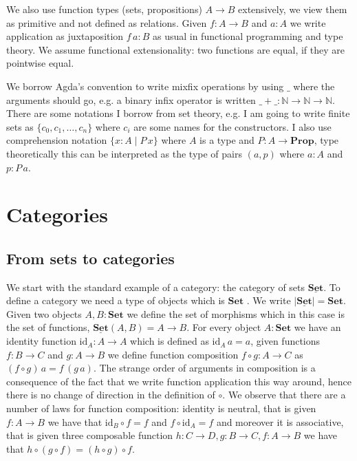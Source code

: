 \documentclass{article}
\newcommand{\Type}{\mathbf{Type}}
\newcommand{\TYPE}{\mathbf{TYPE}}
\newcommand{\Prop}{\mathbf{Prop}}
\newcommand{\PROP}{\mathbf{PROP}}
\newcommand{\Set}{\mathbf{Set}}
\newcommand{\SET}{\mathbf{SET}}
\newcommand{\cat}[1]{\underline{\mathbf{#1}}}
\newcommand{\cSet}{\cat{\Set}}
\newcommand{\obj}[1]{|#1|}
\newcommand{\id}{\mathrm{id}}
\newcommand{\Nat}{\mathbb{N}}
\begin{document}

We also use function types (sets, propositions) $A \to B$  extensively, we view them as primitive and not defined as relations. Given $f : A \to B$ and $a : A$ we write application as juxtaposition $f\,a : B$ as usual in functional programming and type theory. We assume functional extensionality: two functions are equal, if they are pointwise equal. 

We borrow Agda's convention to write mixfix operations by using $\_$ where the arguments should go, e.g. a binary infix operator is written $\_+\_ : \Nat \to \Nat \to \Nat$. There are some notations I borrow from set theory, e.g. I am going to write finite sets as $\{c_0,c_1, \dots, c_n \}$ where $c_i$ are some names for the constructors. I also use comprehension notation $\{ x : A \mid P\,x \}$ where $A$ is a type and $P :A \to \Prop$, type theoretically this can be interpreted as the type of pairs $(a,p)$ where $a:A$ and $p : P\,a$.%

\section{Categories}
\label{sec:categories}

\subsection{From sets to categories}
\label{sec:from-sets-categories}

We start with the standard example of a category: the category of sets $\cSet$. To define a category we need a type of objects which is $\Set$
. We write $\obj{\cSet} = \Set$. 
Given two objects $A,B : \Set$ we define the set of morphisms which in this case is the set of functions, $\cSet(A,B) = A \to B$. For every object $A : \Set$ we have an identity function $\id_A : A \to A$ which is defined as $\id_A\,a = a$, given functions $f : B \to C$ and $g : A \to B$ we define function composition $f \circ g : A \to C$ as $(f\circ g)\,a = f\,(g\,a)$. The strange order of arguments in composition is a consequence of the fact that we write function application this way around, hence there is no change of direction in the definition of $\circ$. We observe that there are a number of laws for function composition: identity is neutral, that is given $f : A \to B$ we have that $\id_B \circ f = f$ and $f \circ \id_A = f$ and moreover it is associative, that is given three composable function $h : C \to D, g : B \to C, f : A \to B$ we have that $h \circ (g \circ f) = (h \circ g) \circ f$.
\end{document}
